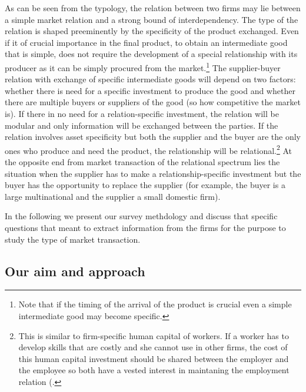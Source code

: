 \documentclass[final, dvipsnames, authoryear,12pt]{elsarticle}
\begin{document}
    As can be seen from the typology, the relation between two firms may lie between a simple market relation and a strong bound of interdependency. The type of the relation is shaped preeminently by the specificity of the product exchanged. Even if it of crucial importance in the final product, to obtain an intermediate good that is simple, does not require the development of a special relationship with its producer as it can be simply procured from the market.\footnote{Note that if the timing of the arrival of the product is crucial even a simple intermediate good may become specific.} The supplier-buyer relation with exchange of specific intermediate goods will depend on two factors: whether there is need for a specific investment to produce the good and whether there are multiple buyers or suppliers of the good (so how competitive the market is). If there in no need for a relation-specific investment, the relation will be modular and only information will be exchanged between the parties. If the relation involves asset specificity but both the supplier and the buyer are the only ones who produce and need the product, the relationship will be relational.\footnote{This is similar to firm-specific human capital of workers. If a worker has to develop skills that are costly and she cannot use in other firms, the cost of this human capital investment should be shared between the employer and the employee so both have a vested interest in maintaning the employment relation (\cite{becker1962investment}.} At the opposite end from market transaction of the relational spectrum lies the situation when the supplier has to make a relationship-specific investment but the buyer has the opportunity to replace the supplier (for example, the buyer is a large multinational and the supplier a small domestic firm).  
    
    In the following we present our survey methdology and discuss that specific questions that meant to extract information from the firms for the purpose to study the type of market transaction.
  
\subsection{Our aim and approach}
\end{document}
